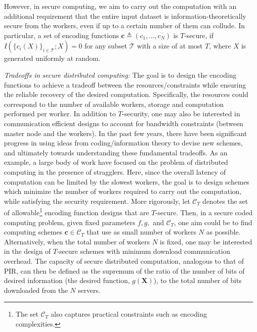 However, in secure computing, we aim to carry out the computation with an additional requirement that the entire input dataset is information-theoretically secure from the workers, even if up to a certain number of them can collude. In particular, a set of encoding functions $\boldsymbol{c}\triangleq (c_1,\ldots,c_N)$ is $T$-secure, if 
    $I(\{c_i(X)\}_{i\in\mathcal{T}};X)=0$
for any subset $\mathcal{T}$ with a size of at most $T$, where $X$ is generated uniformly at random.

{\it Tradeoffs in secure distributed computing:} The goal is to design the encoding functions to achieve a tradeoff between the resources/constraints while ensuring the reliable recovery of the desired computation. Specifically, the resources could correspond to the number of available workers, storage and computation performed per worker. In addition to $T$-security, one may also be interested in communication efficient designs to account for bandwidth constraints (between master node and the workers). In the past few years, there have been significant progress in using ideas from coding/information theory to devise new schemes, and ultimately towards understanding these fundamental tradeoffs. As an example, a large body of work \cite{lee2015speeding, tandon2016gradient, yu2017optimally, dutta2016short, 8949560} have focused on the problem of distributed computing in the presence of stragglers. Here, since the overall latency of computation can be limited by the slowest workers, the goal is to design schemes which minimize the number of workers required to carry out the computation,  while satisfying the security requirement. 
More rigorously, let $\mathcal{C}_T$ denotes the set of allowable\footnote{The set $\mathcal{C}_T$ also captures practical constraints such as encoding complexities.} encoding function designs that are $T$-secure. Then, in a secure coded computing problem, given fixed parameters  $f,g,$ and $\mathcal{C}_T$, one aim could be to find computing schemes $\boldsymbol{c}\in \mathcal{C}_T$ that use as small number of workers $N$ as possible. Alternatively, when the total number of workers $N$ is fixed, one may be interested in the design of $T$-secure schemes with minimum download communication overhead. The capacity of secure distributed computation, analogous to that of PIR, can then be defined as the supremum of the ratio of the number of bits of desired information (the desired function, $g(\mathbf{X})$), to the total number of bits downloaded from the $N$ servers. 



